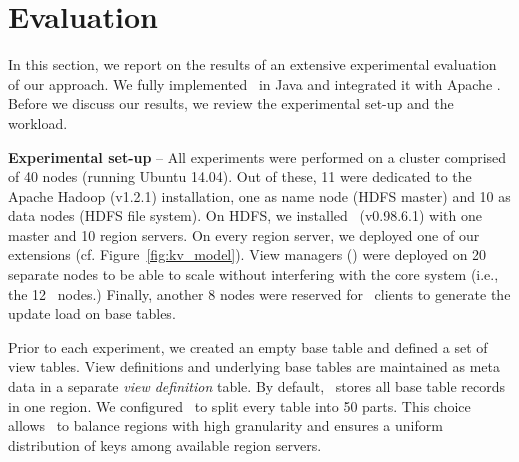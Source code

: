 \section{Evaluation}
\label{sec:evaluation}

In this section, we report on the results of an extensive experimental
evaluation of our approach.  We fully implemented \VMS\ in Java and
integrated it with Apache \HB. Before we discuss our results, we
review the experimental set-up and the workload.


%
%
\noindent
{\bf Experimental set-up} --
 All experiments were performed on a cluster comprised of 40 nodes
(running Ubuntu 14.04). Out of these, 11 were dedicated to the Apache
Hadoop (v1.2.1) installation, one as name node (HDFS master) and 10 as
data nodes (HDFS file system). On HDFS, we installed \HB\ (v0.98.6.1)
with one master and 10 region servers. On every region server, we
deployed one of our extensions (cf. Figure~\ref{fig:kv_model}). View
managers (\VMs) were deployed on 20 separate nodes to be able to scale
without interfering with the core system (i.e., the 12 \HB\ nodes.)
Finally, another 8 nodes were reserved for \HB\ clients to generate
the update load on base tables.

Prior to each experiment, we created an empty base table and defined a
set of view tables. View definitions and underlying base tables are
maintained as meta data in a separate \textit{view definition}
table. By default, \HB\ stores all base table records in one
region. We configured \HB\ to split every table into 50 parts. This
choice allows \HB\ to balance regions with high granularity and
ensures a uniform distribution of keys among available region servers.

